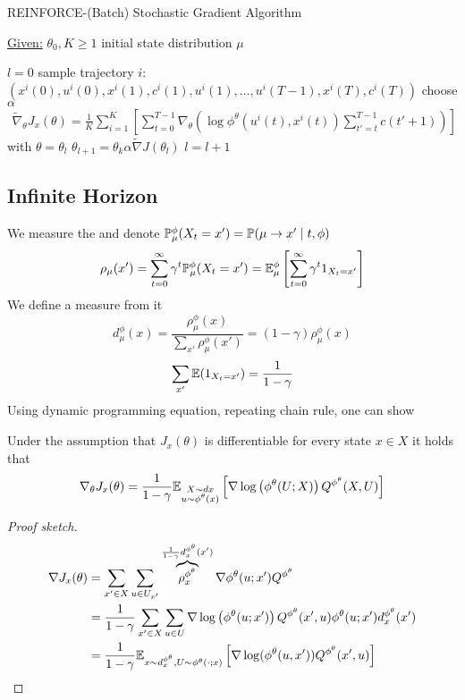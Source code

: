 \begin{algorithm}[H]
    \caption{REINFORCE-(Batch) Stochastic Gradient Algorithm}\label{alg:reinforce}
    \underline{Given:} \(\theta_0,K\geq 1\) initial state distribution \(\mu\)
    \begin{algorithmic}
    \State \(l=0\)
            \State sample trajectory \(i\): \((x^i(0),u^i(0),x^i(1),c^i(1),u^i(1),\dots, u^i(T-1),x^i(T),c^i(T))\)
        \EndFor
        \State choose \(\alpha\)
        \State \begin{align*}
            \tilde{\nabla}_\theta J_x(\theta)=\frac{1}{K}\sum_{i=1}^K\left[\sum_{t=0}^{T-1}\nabla_\theta \left(\log \phi^\theta(u^i(t),x^i(t))\sum_{t'=t}^{T-1}c(t'+1)\right)\right]
        \end{align*} with \(\theta=\theta_l\)
        \State \(\theta_{l+1}=\theta_k\alpha \tilde{\nabla}J(\theta_l)\)
        \State \(l=l+1\) 
    \EndWhile
\end{algorithmic}
\end{algorithm}

\subsection{Infinite Horizon}

We measure the  and denote \(\mathbb{P}_\mu^\phi(X_t=x')=\mathbb{P}(\mu\to x'\mid t,\phi)\)
\[\rho_\mu(x')=\sum_{t=0}^{\infty}\gamma^t\mathbb{P}_\mu^\phi(X_t=x')=\mathbb{E}_\mu^\phi\left[\sum_{t=0}^{\infty}\gamma^t 1_{X_t=x'}\right]\]
We define a measure from it 
\[d_\mu^\phi(x)=\frac{\rho_\mu^\phi(x)}{\sum_{x'}\rho_\mu^\phi(x')}=(1-\gamma)\rho_\mu^\phi(x)\]
\[\sum_{x'}\mathbb{E}(1_{X_t=x'})=\frac{1}{1-\gamma}\] %
Using dynamic programming equation, repeating chain rule, one can show 
\begin{theorem}\label{thm:55}
Under the assumption that \(J_x(\theta)\) is differentiable for every state \(x\in X\) it holds 
that 
\[\nabla_\theta J_x(\theta)=\frac{1}{1-\gamma}\mathbb{E}_{\substack{X\sim dx\\u\sim \phi^\theta(x)}}\left[\nabla\log\left(\phi^\theta(U;X)\right)Q^{\phi^\theta}(X,U)\right]\]    
\end{theorem}

\begin{proof}[Proof sketch]

\begin{align*}
    \nabla J_x(\theta)&=\sum_{x'\in X}\sum_{u\in U_{x'}}\overbrace{\rho_x^{\phi^\theta}}^{\frac{1}{1-\gamma}d_x^{\phi^\theta}(x')}\nabla\phi^\theta(u;x')Q^{\phi^\theta}\\
    &=\frac{1}{1-\gamma}\sum_{x'\in X}\sum_{u\in U}\nabla\log\left(\phi^\theta(u;x')\right)Q^{\phi^\theta}(x',u)\phi^\theta(u;x')d_x^{\phi^\theta}(x')\\
    &=\frac{1}{1-\gamma}\mathbb{E}_{x\sim d_x^{\phi^\theta},U\sim\phi^\theta(\cdot;x)}\left[\nabla\log (\phi^\theta(u,x'))Q^{\phi^\theta}(x',u)\right]
\end{align*}

\end{proof}

